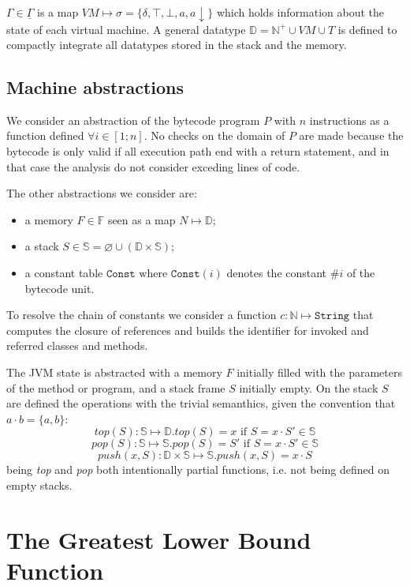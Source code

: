 \documentclass{amsart}
\newcommand{\N}{\mathbb{N}}
\newcommand{\bF}{\mathbb{F}}
\newcommand{\bS}{\mathbb{S}}
\newcommand{\data}{\mathbb{D}}
\newcommand{\down}[1]{#1\downarrow}
\newcommand{\Int}{\N^+}
\newcommand{\Gset}{\underline{\Gamma}}
\newcommand{\Const}{\texttt{Const}}
\renewcommand{\emptyset}{\varnothing}
\numberwithin{equation}{section}
\theoremstyle{plain} %
\theoremstyle{definition}
\theoremstyle{remark}
\begin{document}
$\Gamma \in \Gset{}$ is a map $VM \mapsto \sigma = \{\delta, \top, \bot, a, \down{a}\}$ which holds information about the state of each virtual machine.
A general datatype $\data{} = \Int{} \cup VM \cup T$ is defined to compactly integrate all datatypes stored in the stack and the memory.

\subsection{Machine abstractions}
We consider an abstraction of the bytecode program $P$ with $n$ instructions as a function defined $\forall i \in [1 ; n]$. No checks on the domain of $P$ are made because the bytecode is only valid if all execution path end with a return statement, and in that case the analysis do not consider exceding lines of code.

The other abstractions we consider are:
\begin{itemize}
\item a memory $F \in \bF{}$ seen as a map $N \mapsto \data{}$;
\item a stack $S \in \bS{} = \emptyset \cup (\data{} \times \bS{})$;
\item a constant table $\Const{} \text{ where } \Const{}(i)$ denotes the constant $\#i$ of the bytecode unit.
\end{itemize}

To resolve the chain of constants we consider a function $c : \N{} \mapsto \texttt{String}$ that computes the closure of references and builds the identifier for invoked and referred classes and methods.

The JVM state is abstracted with a memory $F$ initially filled with the parameters of the method or program, and a stack frame $S$ initially empty. On the stack $S$ are defined the operations with the trivial semanthics, given the convention that $a\cdot b = \{a, b\} $:
\[
top(S): \bS{} \mapsto \data{}.top(S) = x \text{ if } S = x \cdot S' \in \bS{}
\]\[pop(S): \bS{} \mapsto \bS{}.pop(S) = S' \text{ if } S = x \cdot S' \in \bS{}
\]\[push(x, S): \data{} \times \bS{} \mapsto \bS{}.push(x, S) = x \cdot S
\]
being \emph{top} and \emph{pop} both intentionally partial functions, i.e. not being defined on empty stacks.\\


\section{The Greatest Lower Bound Function}
\end{document}
